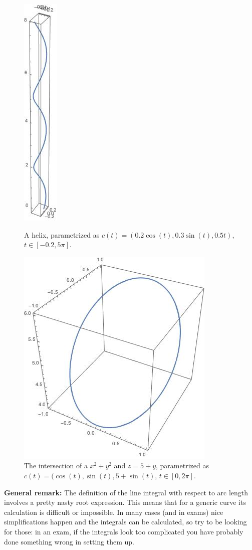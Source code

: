 \documentclass[12pt]{article}
\begin{document}
\begin{figure}[h]
\centering
\parbox{5cm}{
\includegraphics[scale=.3]{helix.jpeg}
\caption{A helix, parametrized as $c(t)=(0.2\cos(t),0.3\sin(t),0.5 t)$, $t\in [-0.2,5\pi]$.}
\label{fig5}}
\qquad
\begin{minipage}{5cm}
\includegraphics[scale=.3]{intersection.jpeg}
\caption{The intersection of a $x^2+y^2$ and $z=5+y$, parametrized as $c(t)=(\cos(t),\sin(t),5+\sin(t)$, $t\in[0,2\pi]$.}
\label{fig6}
\end{minipage}
\end{figure}



\textbf{General remark:} The definition of the line integral with respect to arc length involves a pretty nasty root expression. This means that for a generic curve its calculation is difficult or impossible. In many cases (and in exams) nice simplifications happen and the integrals can be calculated, so try to be looking for those: in an exam, if the integrals look too complicated you have probably done something wrong in setting them up.
\end{document}

